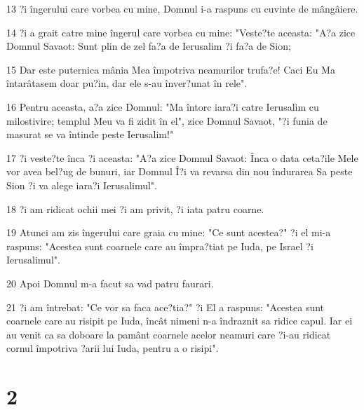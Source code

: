 \par 13 ?i îngerului care vorbea cu mine, Domnul i-a raspuns cu cuvinte de mângâiere.
\par 14 ?i a grait catre mine îngerul care vorbea cu mine: "Veste?te aceasta: "A?a zice Domnul Savaot: Sunt plin de zel fa?a de Ierusalim ?i fa?a de Sion;
\par 15 Dar este puternica mânia Mea împotriva neamurilor trufa?e! Caci Eu Ma întarâtasem doar pu?in, dar ele s-au înver?unat în rele".
\par 16 Pentru aceasta, a?a zice Domnul: "Ma întorc iara?i catre Ierusalim cu milostivire; templul Meu va fi zidit în el", zice Domnul Savaot, "?i funia de masurat se va întinde peste Ierusalim!"
\par 17 ?i veste?te înca ?i aceasta: "A?a zice Domnul Savaot: Înca o data ceta?ile Mele vor avea bel?ug de bunuri, iar Domnul Î?i va revarsa din nou îndurarea Sa peste Sion ?i va alege iara?i Ierusalimul".
\par 18 ?i am ridicat ochii mei ?i am privit, ?i iata patru coarne.
\par 19 Atunci am zis îngerului care graia cu mine: "Ce sunt acestea?" ?i el mi-a raspuns: "Acestea sunt coarnele care au împra?tiat pe Iuda, pe Israel ?i Ierusalimul".
\par 20 Apoi Domnul m-a facut sa vad patru faurari.
\par 21 ?i am întrebat: "Ce vor sa faca ace?tia?" ?i El a raspuns: "Acestea sunt coarnele care au risipit pe Iuda, încât nimeni n-a îndraznit sa ridice capul. Iar ei au venit ca sa doboare la pamânt coarnele acelor neamuri care ?i-au ridicat cornul împotriva ?arii lui Iuda, pentru a o risipi".

\chapter{2}

